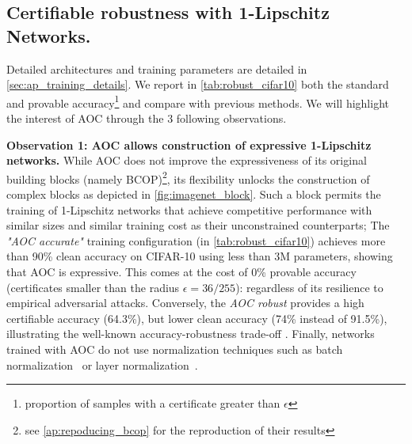 \subsection{Certifiable robustness with 1-Lipschitz Networks.}\label{subsec:certif_rob}
Detailed architectures and training parameters are detailed in \cref{sec:ap_training_details}. We report in \cref{tab:robust_cifar10} both the standard and provable accuracy\footnote{proportion of samples with a certificate greater than $\epsilon$}  and compare with previous methods.  
We will highlight the interest of AOC through the 3 following observations.

\noindent\textbf{Observation 1: AOC allows construction of expressive 1-Lipschitz networks.}
While AOC does not improve the expressiveness of its original building blocks (namely BCOP)\footnote{see \cref{ap:repoducing_bcop} for the reproduction of their results}, its flexibility unlocks the construction of complex blocks as depicted in \cref{fig:imagenet_block}. Such a block permits the training of 1-Lipschitz networks that achieve competitive performance with similar sizes and similar training cost as their unconstrained counterparts; 
The \textit{"AOC accurate"} training configuration (in \cref{tab:robust_cifar10}) achieves more than  90\% clean accuracy on  CIFAR-10 using less than 3M parameters, showing that AOC is expressive.
This comes at the cost of 0\% provable accuracy (certificates smaller than the radius $\epsilon = 36/255$): regardless of its resilience to empirical adversarial attacks.
Conversely, the \textit{AOC robust} provides a high certifiable accuracy (64.3\%), but lower clean accuracy (74\% instead of 91.5\%), illustrating the well-known accuracy-robustness trade-off \cite{bethune_pay_2022}. Finally, networks trained with AOC do not use normalization techniques such as batch normalization~\cite{ioffe2015batch} or layer normalization~\cite {ba2016layer}. 

